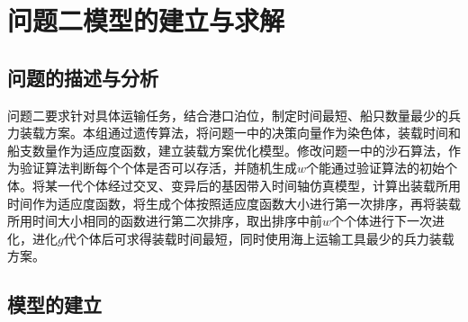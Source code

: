 \documentclass{whutmod}
\begin{document}
	
		
	\section{问题二模型的建立与求解}
	\subsection{问题的描述与分析}

	问题二要求针对具体运输任务，结合港口泊位，制定时间最短、船只数量最少的兵力装载方案。本组通过遗传算法，将问题一中的决策向量作为染色体，装载时间和船支数量作为适应度函数，建立装载方案优化模型。修改问题一中的沙石算法，作为验证算法判断每个个体是否可以存活，并随机生成$w$个能通过验证算法的初始个体。将某一代个体经过交叉、变异后的基因带入时间轴仿真模型，计算出装载所用时间作为适应度函数，将生成个体按照适应度函数大小进行第一次排序，再将装载所用时间大小相同的函数进行第二次排序，取出排序中前$w$个个体进行下一次进化，进化$g$代个体后可求得装载时间最短，同时使用海上运输工具最少的兵力装载方案。	                                                                                                   
	\subsection{模型的建立}
\end{document}
